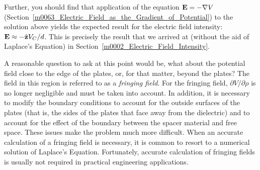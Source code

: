 Further, you should find that application of the equation ${\bf E} = - \nabla V$ (Section~\ref{m0063_Electric_Field_as_the_Gradient_of_Potential}) to the solution above yields the expected result for the electric field intensity: ${\bf E} \approx -\hat{\bf z}V_C/d$.  
This is precisely the result that we arrived at (without the aid of Laplace's Equation) in Section~\ref{m0002_Electric_Field_Intensity}.   

A reasonable question to ask at this point would be, what about the potential field close to the edge of the plates, or, for that matter, beyond the plates?  
The field in this region is referred to as a \emph{fringing field}. 
For the fringing field, $\partial V/ \partial \rho$ is no longer negligible and must be taken into account.  In addition, it is necessary to modify the boundary conditions to account for the outside surfaces of the plates (that is, the sides of the plates that face away from the dielectric) and to account for the effect of the boundary between the spacer material and free space. 
These issues make the problem much more difficult.
When an accurate calculation of a fringing field is necessary, it is common to resort to a numerical solution of Laplace's Equation.
Fortunately, accurate calculation of fringing fields is usually not required in practical engineering applications.

